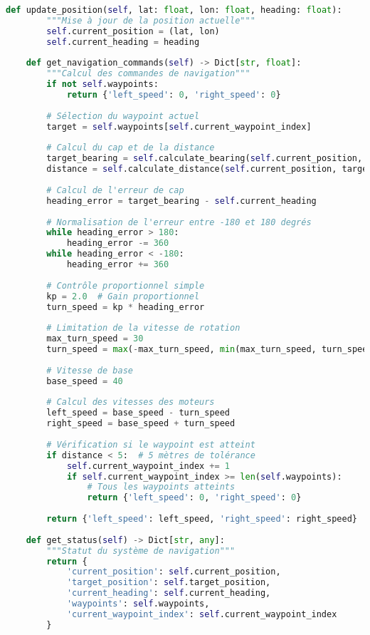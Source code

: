 \begin{lstlisting}[language=Python, caption=Système de navigation, label=lst:navigation-system]
    def update_position(self, lat: float, lon: float, heading: float):
        """Mise à jour de la position actuelle"""
        self.current_position = (lat, lon)
        self.current_heading = heading
    
    def get_navigation_commands(self) -> Dict[str, float]:
        """Calcul des commandes de navigation"""
        if not self.waypoints:
            return {'left_speed': 0, 'right_speed': 0}
        
        # Sélection du waypoint actuel
        target = self.waypoints[self.current_waypoint_index]
        
        # Calcul du cap et de la distance
        target_bearing = self.calculate_bearing(self.current_position, target)
        distance = self.calculate_distance(self.current_position, target)
        
        # Calcul de l'erreur de cap
        heading_error = target_bearing - self.current_heading
        
        # Normalisation de l'erreur entre -180 et 180 degrés
        while heading_error > 180:
            heading_error -= 360
        while heading_error < -180:
            heading_error += 360
        
        # Contrôle proportionnel simple
        kp = 2.0  # Gain proportionnel
        turn_speed = kp * heading_error
        
        # Limitation de la vitesse de rotation
        max_turn_speed = 30
        turn_speed = max(-max_turn_speed, min(max_turn_speed, turn_speed))
        
        # Vitesse de base
        base_speed = 40
        
        # Calcul des vitesses des moteurs
        left_speed = base_speed - turn_speed
        right_speed = base_speed + turn_speed
        
        # Vérification si le waypoint est atteint
        if distance < 5:  # 5 mètres de tolérance
            self.current_waypoint_index += 1
            if self.current_waypoint_index >= len(self.waypoints):
                # Tous les waypoints atteints
                return {'left_speed': 0, 'right_speed': 0}
        
        return {'left_speed': left_speed, 'right_speed': right_speed}
    
    def get_status(self) -> Dict[str, any]:
        """Statut du système de navigation"""
        return {
            'current_position': self.current_position,
            'target_position': self.target_position,
            'current_heading': self.current_heading,
            'waypoints': self.waypoints,
            'current_waypoint_index': self.current_waypoint_index
        }
\end{lstlisting}

